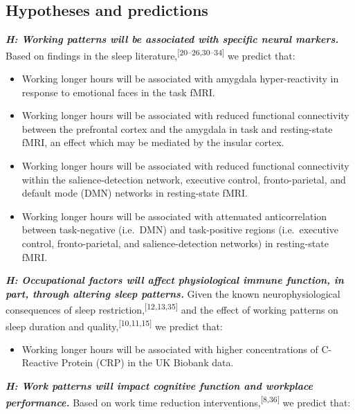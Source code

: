 \documentclass[
  english,
  man, donotrepeattitle,floatsintext]{apa6}
\providecommand{\tightlist}{%
  \setlength{\itemsep}{0pt}\setlength{\parskip}{0pt}}
\begin{document}
\newpage

\hypertarget{hypotheses-and-predictions}{%
\subsection{Hypotheses and predictions}\label{hypotheses-and-predictions}}

\textbf{\emph{H: Working patterns will be associated with specific neural markers.}} Based on findings in the sleep literature,\textsuperscript{{[}20--26,30--34{]}} we predict that:

\begin{itemize}
\item
  Working longer hours will be associated with amygdala hyper-reactivity in response to emotional faces in the task fMRI.
\item
  Working longer hours will be associated with reduced functional connectivity between the prefrontal cortex and the amygdala in task and resting-state fMRI, an effect which may be mediated by the insular cortex.
\item
  Working longer hours will be associated with reduced functional connectivity within the salience-detection network, executive control, fronto-parietal, and default mode (DMN) networks in resting-state fMRI.
\item
  Working longer hours will be associated with attenuated anticorrelation between task-negative (i.e.~DMN) and task-positive regions (i.e.~executive control, fronto-parietal, and salience-detection networks) in resting-state fMRI.
\end{itemize}

\hspace{1cm}

\textbf{\emph{H: Occupational factors will affect physiological immune function, in part, through altering sleep patterns.}} Given the known neurophysiological consequences of sleep restriction,\textsuperscript{{[}12,13,35{]}} and the effect of working patterns on sleep duration and quality,\textsuperscript{{[}10,11,15{]}} we predict that:

\begin{itemize}
\tightlist
\item
  Working longer hours will be associated with higher concentrations of C-Reactive Protein (CRP) in the UK Biobank data.
\end{itemize}

\textbf{\emph{H: Work patterns will impact cognitive function and workplace performance.}} Based on work time reduction interventions,\textsuperscript{{[}8,36{]}} we predict that:
\end{document}
